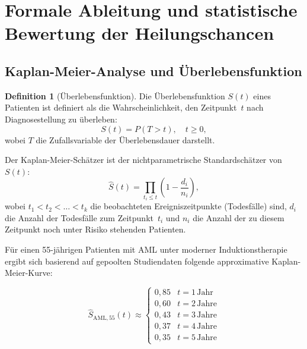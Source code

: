 ﻿\documentclass[12pt,a4paper]{article}
\theoremstyle{definition}
\newtheorem{definition}[theorem]{Definition}
\begin{document}
\section{Formale Ableitung und statistische Bewertung der Heilungschancen}
\label{sec:formal}

\subsection{Kaplan-Meier-Analyse und Überlebensfunktion}

\begin{definition}[Überlebensfunktion]
  Die Überlebensfunktion $S(t)$ eines Patienten ist definiert als die
  Wahrscheinlichkeit, den Zeitpunkt~$t$ nach Diagnosestellung zu überleben:
  \begin{equation}
    S(t) = P(T > t), \quad t \geq 0,
    \label{eq:survival_function}
  \end{equation}
  wobei $T$ die Zufallsvariable der Überlebensdauer darstellt.
\end{definition}

Der Kaplan-Meier-Schätzer \cite{kaplan1958} ist der nichtparametrische
Standardschätzer von $S(t)$:
\begin{equation}
  \hat{S}(t) = \prod_{t_i \leq t} \left(1 - \frac{d_i}{n_i}\right),
  \label{eq:km}
\end{equation}
wobei $t_1 < t_2 < \ldots < t_k$ die beobachteten Ereigniszeitpunkte (Todesfälle)
sind, $d_i$ die Anzahl der Todesfälle zum Zeitpunkt~$t_i$ und $n_i$ die Anzahl der
zu diesem Zeitpunkt noch unter Risiko stehenden Patienten.

Für einen 55-jährigen Patienten mit AML unter moderner Induktionstherapie ergibt
sich basierend auf gepoolten Studiendaten \cite{dohner2017,burnett2007} folgende
approximative Kaplan-Meier-Kurve:

\begin{equation}
  \hat{S}_{\mathrm{AML},55}(t) \approx
  \begin{cases}
    0{,}85 & t = 1\,\text{Jahr} \\
    0{,}60 & t = 2\,\text{Jahre} \\
    0{,}43 & t = 3\,\text{Jahre} \\
    0{,}37 & t = 4\,\text{Jahre} \\
    0{,}35 & t = 5\,\text{Jahre}
  \end{cases}
  \label{eq:km_aml}
\end{equation}
\end{document}
